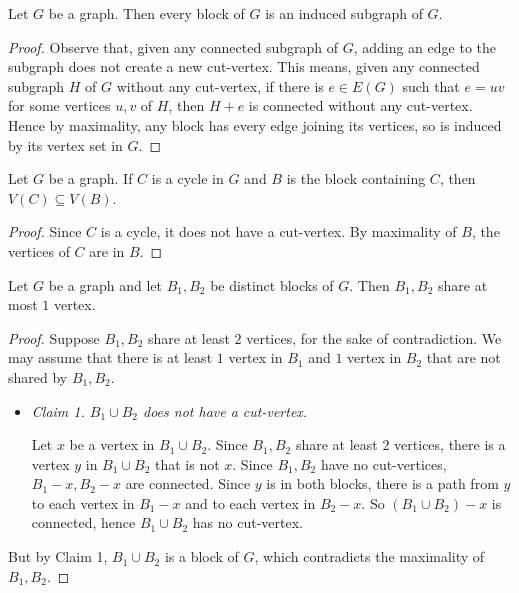 \documentclass[co342]{subfiles}
\begin{document}
    \begin{prop}{}
        Let $G$ be a graph. Then every block of $G$ is an induced subgraph of $G$.
    \end{prop}

    \begin{proof}
        Observe that, given any connected subgraph of $G$, adding an edge to the subgraph does not create a new cut-vertex. This means, given any connected subgraph $H$ of $G$ without any cut-vertex, if there is $e\in E\left( G \right)$ such that $e=uv$ for some vertices $u,v$ of $H$, then $H+e$ is connected without any cut-vertex. Hence by maximality, any block has every edge joining its vertices, so is induced by its vertex set in $G$.
    \end{proof}

    \begin{prop}{}
        Let $G$ be a graph. If $C$ is a cycle in $G$ and $B$ is the block containing $C$, then $V\left( C \right)\subseteq V\left( B \right)$.
    \end{prop}

    \begin{proof}
        Since $C$ is a cycle, it does not have a cut-vertex. By maximality of $B$, the vertices of $C$ are in $B$.
    \end{proof}

    \begin{prop}{}
        Let $G$ be a graph and let $B_1,B_2$ be distinct blocks of $G$. Then $B_1,B_2$ share at most $1$ vertex.
    \end{prop}

    \begin{proof}
        Suppose $B_1,B_2$ share at least $2$ vertices, for the sake of contradiction. We may assume that there is at least $1$ vertex in $B_1$ and $1$ vertex in $B_2$ that are not shared by $B_1,B_2$. 
        \begin{itemize}
            \item \textit{Claim 1. $B_1\cup B_2$ does not have a cut-vertex.}

                \begin{subproof}
                    Let $x$ be a vertex in $B_1\cup B_2$. Since $B_1,B_2$ share at least $2$ vertices, there is a vertex $y$ in $B_1\cup B_2$ that is not $x$. Since $B_1,B_2$ have no cut-vertices, $B_1-x, B_2-x$ are connected. Since $y$ is in both blocks, there is a path from $y$ to each vertex in $B_1-x$ and to each vertex in $B_2-x$. So $\left( B_1\cup B_2 \right)-x$ is connected, hence $B_1\cup B_2$ has no cut-vertex. 
                \end{subproof}
        \end{itemize} 
        But by Claim 1, $B_1\cup B_2$ is a block of $G$, which contradicts the maximality of $B_1,B_2$. 
    \end{proof}
    
\end{document}
